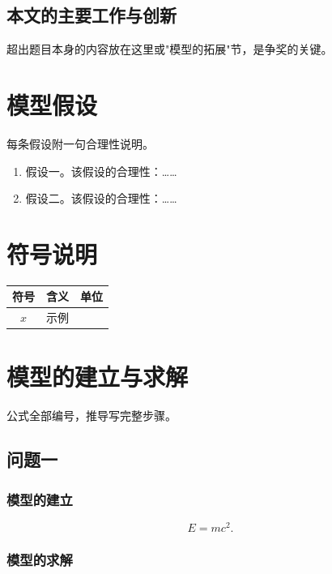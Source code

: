 \documentclass[withoutpreface,bwprint]{cumcmthesis}
\begin{document}
\subsection{本文的主要工作与创新}

超出题目本身的内容放在这里或"模型的拓展"节，是争奖的关键。

\section{模型假设}

每条假设附一句合理性说明。

\begin{enumerate}
  \item 假设一。该假设的合理性：……
  \item 假设二。该假设的合理性：……
\end{enumerate}

\section{符号说明}

\begin{table}[H]
\centering
\begin{tabular}{cll}
\toprule
符号 & 含义 & 单位 \\
\midrule
$x$ & 示例 & \\
\bottomrule
\end{tabular}
\end{table}

\section{模型的建立与求解}

公式全部编号，推导写完整步骤。

\subsection{问题一}

\subsubsection{模型的建立}

\begin{equation}
E = mc^2 .
\end{equation}

\subsubsection{模型的求解}
\end{document}
